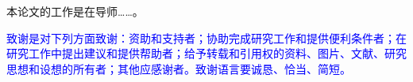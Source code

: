 
\begin{acknowledgements}

本论文的工作是在导师……。

\textcolor{blue}{
  致谢是对下列方面致谢：资助和支持者；协助完成研究工作和提供便利条件者；在研究工作中提出建议和提供帮助者；给予转载和引用权的资料、图片、文献、研究思想和设想的所有者；其他应感谢者。致谢语言要诚恳、恰当、简短。
}

\end{acknowledgements}
